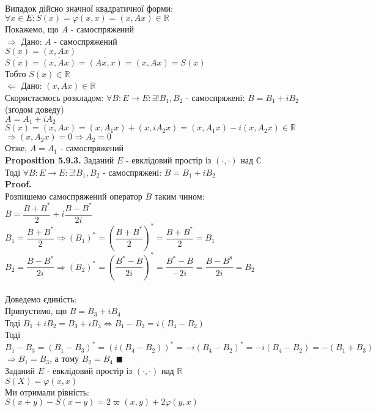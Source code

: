 \documentclass[a4paper, 14pt]{extarticle}
\def\prp#1{\textbf{Proposition {#1}}}
\def\proof{\textbf{Proof.}\\}
\def\bigline{\vspace{5mm}\\}
\def\qed{$\blacksquare$}
\begin{document}
\bigline
Випадок дійсно значної квадратичної форми:\\
$\forall x \in E: S(x) = \varphi(x,x) = (x,Ax) \in \mathbb{R}$\\
Покажемо, що $A$ - самоспряжений\\
$\boxed{\Rightarrow}$ Дано: $A$ - самоспряжений\\
$S(x) = (x,Ax)$\\
$\overline{S(x)} = \overline{(x,Ax)} = \overline{(Ax,x)} = (x,Ax) = S(x)$\\
Тобто $S(x) \in \mathbb{R}$
\bigline
$\boxed{\Leftarrow}$ Дано: $(x,Ax) \in \mathbb{R}$\\
Скористаємось розкладом: $\forall B: E \to E: \exists ! B_1,B_2$ - самоспряжені: $B = B_1 + i B_2$ (згодом доведу)\\
$A = A_1 + i A_2$\\
$S(x) = (x,Ax)= (x,A_1x) + (x,iA_2x) = (x,A_1x) - i(x,A_2x) \in \mathbb{R}$\\
$\Rightarrow (x,A_2x) = 0 \Rightarrow A_2 = 0$\\
Отже, $A = A_1$ - самоспряжений
\bigline
\prp{5.9.3.} Заданий $E$ - евклідовий простір із $(\cdot, \cdot)$ над $\mathbb{C}$\\
Тоді $\forall B: E \to E: \exists! B_1,B_2$ - самоспряжені: $B = B_1 + i B_2$\\
\proof
Розпишемо самоспряжений оператор $B$ таким чином:\\
$B = \dfrac{B+B^*}{2}+ i \dfrac{B-B^*}{2i}$\\
$B_1 = \dfrac{B+B^*}{2} \Rightarrow (B_1)^* = \left( \dfrac{B+B^*}{2} \right)^* = \dfrac{B+B^*}{2} = B_1$\\
$B_2 = \dfrac{B-B^*}{2i} \Rightarrow (B_2)^* = \left( \dfrac{B^*-B}{2i} \right)^* = \dfrac{B^*-B}{-2i} = \dfrac{B-B^8}{2i} = B_2$\\
\\
Доведемо єдиність:\\
Припустимо, що $B = B_3 + i B_4$\\
Тоді $B_1 + iB_2 = B_3 + iB_3 \iff B_1-B_3 = i(B_4-B_2)$\\
Тоді $B_1-B_3=(B_1-B_3)^* = (i(B_4-B_2))^* = -i(B_4-B_2)^* = -i(B_4-B_2) = -(B_1+B_3)$\\
$\Rightarrow B_1 = B_3$, а тому $B_2 = B_4$ \qed
\bigline
Заданий $E$ - евклідовий простір із $(\cdot, \cdot)$ над $\mathbb{R}$\\
$S(X) = \varphi(x,x)$\\
Ми отримали рівність:\\
$S(x+y)-S(x-y) = 2\varpi(x,y) + 2\varphi(y,x)$\\
\end{document}
